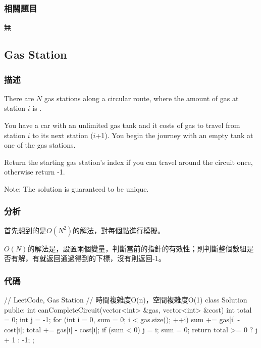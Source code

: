 \subsubsection{相關題目}
\begindot
\item 無
\myenddot


\subsection{Gas Station} %
\label{sec:gas-station}


\subsubsection{描述}
There are $N$ gas stations along a circular route, where the amount of gas at station $i$ is .

You have a car with an unlimited gas tank and it costs  of gas to travel from station $i$ to its next station ($i$+1). You begin the journey with an empty tank at one of the gas stations.

Return the starting gas station's index if you can travel around the circuit once, otherwise return -1.

Note:
The solution is guaranteed to be unique.


\subsubsection{分析}
首先想到的是$O(N^2)$的解法，對每個點進行模擬。

$O(N)$的解法是，設置兩個變量，判斷當前的指針的有效性；則判斷整個數組是否有解，有就返回通過得到的下標，沒有則返回-1。


\subsubsection{代碼}
\begin{Code}
// LeetCode, Gas Station
// 時間複雜度O(n)，空間複雜度O(1)
class Solution {
public:
    int canCompleteCircuit(vector<int> &gas, vector<int> &cost) {
        int total = 0;
        int j = -1;
        for (int i = 0, sum = 0; i < gas.size(); ++i) {
            sum += gas[i] - cost[i];
            total += gas[i] - cost[i];
            if (sum < 0) {
                j = i;
                sum = 0;
            }
        }
        return total >= 0 ? j + 1 : -1;
    }
};
\end{Code}


